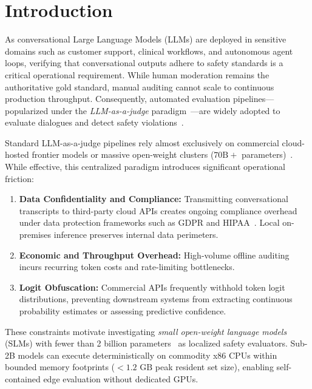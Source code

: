 \section{Introduction}
\label{sec:introduction}

As conversational Large Language Models (LLMs) are deployed in sensitive domains such as customer support, clinical workflows, and autonomous agent loops, verifying that conversational outputs adhere to safety standards is a critical operational requirement. While human moderation remains the authoritative gold standard, manual auditing cannot scale to continuous production throughput. Consequently, automated evaluation pipelines—popularized under the \textit{LLM-as-a-judge} paradigm~\cite{chiang2023vicuna,zheng2023judging,wang2023pandalm}—are widely adopted to evaluate dialogues and detect safety violations~\cite{zhang2024safetybench,mazeika2024harmbench}.

Standard LLM-as-a-judge pipelines rely almost exclusively on commercial cloud-hosted frontier models or massive open-weight clusters ($70\text{B}+$ parameters)~\cite{touvron2023llama,tan2025judgebench,bavaresco2025llms}. While effective, this centralized paradigm introduces significant operational friction:
\begin{enumerate}
    \item \textbf{Data Confidentiality and Compliance:} Transmitting conversational transcripts to third-party cloud APIs creates ongoing compliance overhead under data protection frameworks such as GDPR and HIPAA~\cite{debenedetti2024evading}. Local on-premises inference preserves internal data perimeters.
    \item \textbf{Economic and Throughput Overhead:} High-volume offline auditing incurs recurring token costs and rate-limiting bottlenecks.
    \item \textbf{Logit Obfuscation:} Commercial APIs frequently withhold token logit distributions, preventing downstream systems from extracting continuous probability estimates or assessing predictive confidence.
\end{enumerate}

These constraints motivate investigating \textit{small open-weight language models} (SLMs) with fewer than 2 billion parameters~\cite{yang2024qwen25,allal2025smollm2} as localized safety evaluators. Sub-2B models can execute deterministically on commodity x86 CPUs within bounded memory footprints ($<1.2\text{ GB}$ peak resident set size), enabling self-contained edge evaluation without dedicated GPUs.

